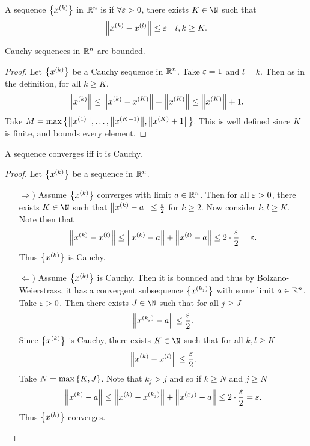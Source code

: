\documentclass[../main.tex]{subfiles}
\begin{document}
\begin{definition}
    A sequence $\qty{x^{(k)}}$ in $\mathbb{R}^n$ is  if $\forall \varepsilon > 0$, there exists $K \in \N$ such that
    \[
        \norm{x^{(k)} - x^{(l)}} \leq \varepsilon \quad l, k \geq K
    .\]
\end{definition}

\begin{theorem}
    Cauchy sequences in $\mathbb{R}^n$ are bounded.
\end{theorem}

\begin{proof}
    Let $\qty{x^{(k)}}$ be a Cauchy sequence in $\mathbb{R}^n$. Take $\varepsilon = 1$ and $l = k$. Then as in the definition, for all $k \geq K$,
    \[
        \norm{x^{(k)}} \leq \norm{x^{(k)} - x^{(K)}} + \norm{x^{(K)}} \leq \norm{x^{(K)}} + 1
    .\]
    Take $M = \max\qty{\norm{x^{(1)}}, \ldots, \norm{x^{(K-1)}}, \norm{x^{(K)} + 1}}$. This is well defined since $K$ is finite, and bounds every element.
\end{proof}

\begin{theorem}[Completeness]
    A sequence converges iff it is Cauchy.
\end{theorem}

\begin{proof}
    Let $\qty{x^{(k)}}$ be a sequence in $\mathbb{R}^n$.
    \begin{enumerate}
        \item[$\Rightarrow)$] Assume $\qty{x^{(k)}}$ converges with limit $a \in \mathbb{R}^n$. Then for all $\varepsilon > 0$, there exists $K \in \N$ such that $\norm{x^{(k)} - a} \leq \frac{\varepsilon}{2}$ for $k \geq 2$. Now consider $k,l \geq K$. Note then that
        \[
            \norm{x^{(k)} - x^{(l)}} \leq \norm{x^{(k)} - a} + \norm{x^{(l)} - a} \leq 2\cdot \frac{\varepsilon}{2} = \varepsilon
        .\]
        Thus $\qty{x^{(k)}}$ is Cauchy.

        \item[$\Leftarrow)$] 
            Assume $\qty{x^{(k)}}$ is Cauchy. Then it is bounded and thus by Bolzano-Weierstrass, it has a convergent subsequence $\qty{x^{(k_j)}}$ with some limit $a \in \mathbb{R}^n$. Take $\varepsilon > 0$. Then there exists $J \in \N$ such that for all $j \geq J$
            \[
                \norm{x^{(k_j)} - a} \leq \frac{\varepsilon}{2}
            .\]
            Since $\qty{x^{(k)}}$ is Cauchy, there exists $K \in \N$ such that for all $k, l \geq K$
            \[
                \norm{x^{(k)} - x^{(l)}} \leq \frac{\varepsilon}{2}
            .\]
            Take $N = \max\qty{K, J}$. Note that $k_j > j$ and so if $k \geq N$ and $j \geq N$
            \[
                \norm{x^{(k)} - a} \leq \norm{x^{(k)} - x^{(k_j)}} + \norm{x^{(x_j)} - a} \leq 2 \cdot \frac{\varepsilon}{2} = \varepsilon
            .\]
            Thus $\qty{x^{(k)}}$ converges.
    \end{enumerate}
\end{proof}
\end{document}

